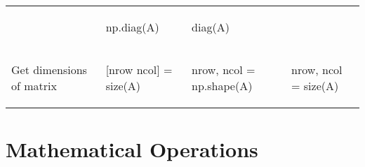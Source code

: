 \documentclass[10pt, landscape]{article}
\newenvironment{Shaded}{}{}
\newcommand{\OperatorTok}[1]{\textcolor[rgb]{0.40,0.40,0.40}{{#1}}}
\newcommand{\NormalTok}[1]{{#1}}
\begin{document}
\begin{multicols}{2}
\begin{tabular}[ ]{@{}llll@{}}
\begin{minipage}[t]{0.23\columnwidth}
\begin{Shaded}
\end{Shaded}
\strut
\end{minipage} & \begin{minipage}[t]{0.23\columnwidth}\raggedright\strut
\begin{Shaded}
\begin{Highlighting}[]
\NormalTok{np.diag(A)}
\end{Highlighting}
\end{Shaded}
\strut
\end{minipage} & \begin{minipage}[t]{0.20\columnwidth}\raggedright\strut
\begin{Shaded}
\begin{Highlighting}[]
\NormalTok{diag(A)}
\end{Highlighting}
\end{Shaded}
\strut
\end{minipage}\tabularnewline
\begin{minipage}[t]{0.23\columnwidth}\raggedright\strut
Get dimensions of matrix\strut
\end{minipage} & \begin{minipage}[t]{0.23\columnwidth}\raggedright\strut
\begin{Shaded}
\begin{Highlighting}[]
\NormalTok{[nrow ncol] = size(A)}
\end{Highlighting}
\end{Shaded}
\strut
\end{minipage} & \begin{minipage}[t]{0.23\columnwidth}\raggedright\strut
\begin{Shaded}
\begin{Highlighting}[]
\NormalTok{nrow, ncol }\OperatorTok{=} \NormalTok{np.shape(A)}
\end{Highlighting}
\end{Shaded}
\strut
\end{minipage} & \begin{minipage}[t]{0.20\columnwidth}\raggedright\strut
\begin{Shaded}
\begin{Highlighting}[]
\NormalTok{nrow, ncol = size(A)}
\end{Highlighting}
\end{Shaded}
\strut
\end{minipage}\tabularnewline
\bottomrule
\end{tabular}

\section{Mathematical Operations}\label{mathematical-operations}


\end{multicols}
\end{document}
